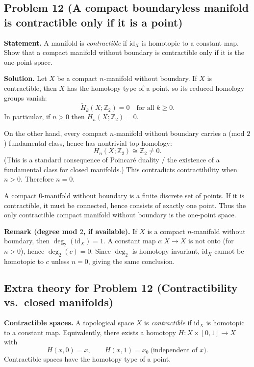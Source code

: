 \documentclass[12pt,a4paper]{article}
\theoremstyle{plain}
\theoremstyle{definition}      %
\begin{document}
\subsection*{Problem 12 (A compact boundaryless manifold is contractible only if it is a point)}

\textbf{Statement.} A manifold is \emph{contractible} if $\mathrm{id}_X$ is homotopic to a constant map.
Show that a compact manifold without boundary is contractible only if it is the one-point space.

\medskip
\noindent\textbf{Solution.}
Let $X$ be a compact $n$-manifold without boundary. If $X$ is contractible, then $X$ has the homotopy type of a point,
so its reduced homology groups vanish:
\[
\widetilde H_k(X;\mathbb{Z}_2)=0 \quad \text{for all } k\ge 0.
\]
In particular, if $n>0$ then $H_n(X;\mathbb{Z}_2)=0$.

On the other hand, every compact $n$-manifold without boundary carries a (mod $2$) fundamental class, hence has nontrivial
top homology:
\[
H_n(X;\mathbb{Z}_2)\cong \mathbb{Z}_2 \neq 0.
\]
(This is a standard consequence of Poincar\'e duality / the existence of a fundamental class for closed manifolds.)
This contradicts contractibility when $n>0$. Therefore $n=0$.

A compact $0$-manifold without boundary is a finite discrete set of points. If it is contractible, it must be connected,
hence consists of exactly one point. Thus the only contractible compact manifold without boundary is the one-point space.

\medskip
\noindent\textbf{Remark (degree mod $2$, if available).}
If $X$ is a compact $n$-manifold without boundary, then $\deg_2(\mathrm{id}_X)=1$.
A constant map $c:X\to X$ is not onto (for $n>0$), hence $\deg_2(c)=0$.
Since $\deg_2$ is homotopy invariant, $\mathrm{id}_X$ cannot be homotopic to $c$ unless $n=0$, giving the same conclusion.

\subsection*{Extra theory for Problem 12 (Contractibility vs.\ closed manifolds)}

\noindent\textbf{Contractible spaces.}
A topological space $X$ is \emph{contractible} if $\mathrm{id}_X$ is homotopic to a constant map.
Equivalently, there exists a homotopy $H:X\times[0,1]\to X$ with
\[
H(x,0)=x,\qquad H(x,1)=x_0 \ \text{(independent of $x$)}.
\]
Contractible spaces have the homotopy type of a point.
\end{document}
